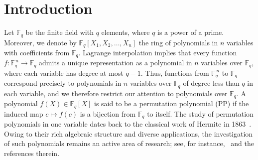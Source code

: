 \documentclass[11pt]{amsart}
\theoremstyle{plain}
\numberwithin{equation}{section}
\def\F{{\mathbb F}}
\begin{document}
\section{Introduction}
Let \(\mathbb{F}_q\) be the finite field with \(q\) elements, where \(q\) is a power of a prime. Moreover, we denote by $\mathbb{F}_q[X_1,X_2,\ldots,X_n]$ the ring of polynomials in $n$ variables with coefficients from $\mathbb{F}_q$.
Lagrange interpolation implies that every function 
\( f : \mathbb{F}_q^{\,n} \to \mathbb{F}_q \) admits a unique representation as a polynomial in \( n \) variables over \( \mathbb{F}_q \), where each variable has degree at most \( q-1 \). Thus, functions from \(\mathbb{F}_q^{\,n}\) to \(\mathbb{F}_q\) correspond precisely to polynomials in \(n\) variables over \(\mathbb{F}_q\) of degree less than \(q\) in each variable, and we therefore restrict our attention to polynomials over $\F_q.$
A polynomial $f(X) \in \F_q[X]$ is said to be a permutation polynomial (PP) if the induced map $c \mapsto f(c)$ is a bijection from $\F_q$ to itself. The study of permutation polynomials in one variable dates back to the classical work of Hermite in 1863~\cite{H}. Owing to their rich algebraic structure and diverse applications, the investigation of such polynomials remains an active area of research; see, for instance,~\cite{Hou_PP_15,Hou_bi_tri,JPB,OT,W,ZKZPL} and the references therein.
\end{document}
